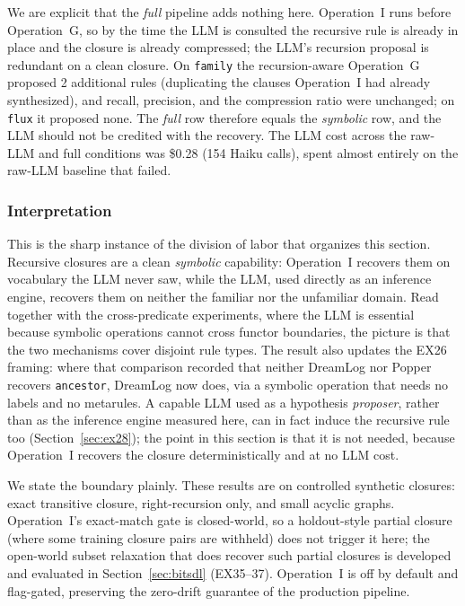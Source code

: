 \documentclass[10pt,conference]{IEEEtran}
\begin{document}
We are explicit that the \textit{full} pipeline adds nothing here. Operation~I runs before Operation~G, so by the time the LLM is consulted the recursive rule is already in place and the closure is already compressed; the LLM's recursion proposal is redundant on a clean closure. On \texttt{family} the recursion-aware Operation~G proposed 2 additional rules (duplicating the clauses Operation~I had already synthesized), and recall, precision, and the compression ratio were unchanged; on \texttt{flux} it proposed none. The \textit{full} row therefore equals the \textit{symbolic} row, and the LLM should not be credited with the recovery. The LLM cost across the raw-LLM and full conditions was \$0.28 (154 Haiku calls), spent almost entirely on the raw-LLM baseline that failed.

\subsubsection{Interpretation}
This is the sharp instance of the division of labor that organizes this section. Recursive closures are a clean \emph{symbolic} capability: Operation~I recovers them on vocabulary the LLM never saw, while the LLM, used directly as an inference engine, recovers them on neither the familiar nor the unfamiliar domain. Read together with the cross-predicate experiments, where the LLM is essential because symbolic operations cannot cross functor boundaries, the picture is that the two mechanisms cover disjoint rule types. The result also updates the EX26 framing: where that comparison recorded that neither DreamLog nor Popper recovers \texttt{ancestor}, DreamLog now does, via a symbolic operation that needs no labels and no metarules. A capable LLM used as a hypothesis \emph{proposer}, rather than as the inference engine measured here, can in fact induce the recursive rule too (Section~\ref{sec:ex28}); the point in this section is that it is not needed, because Operation~I recovers the closure deterministically and at no LLM cost.

We state the boundary plainly. These results are on controlled synthetic closures: exact transitive closure, right-recursion only, and small acyclic graphs. Operation~I's exact-match gate is closed-world, so a holdout-style partial closure (where some training closure pairs are withheld) does not trigger it here; the open-world subset relaxation that does recover such partial closures is developed and evaluated in Section~\ref{sec:bitsdl} (EX35--37). Operation~I is off by default and flag-gated, preserving the zero-drift guarantee of the production pipeline.
\end{document}
